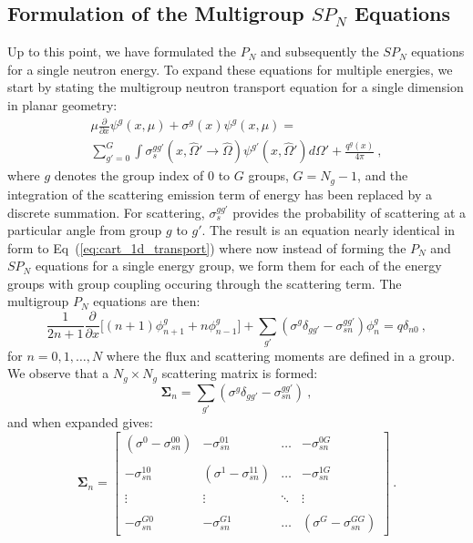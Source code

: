 \documentclass[letterpaper,12pt]{article}
\begin{document}
\subsection{Formulation of the Multigroup $SP_N$ Equations}
\label{subsec:mg_spn_equations}
Up to this point, we have formulated the $P_N$ and subsequently the
$SP_N$ equations for a single neutron energy. To expand these
equations for multiple energies, we start by stating the multigroup
neutron transport equation for a single dimension in planar geometry:
\begin{multline}
  \mu \frac{\partial}{\partial x} \psi^g(x,\mu) + \sigma^g(x)
  \psi^g(x,\mu) = \\ \sum_{g'=0}^{G} \int
  \sigma_s^{gg'}(x,\hat{\Omega}' \rightarrow \hat{\Omega})
  \psi^{g'}(x,\hat{\Omega}') d\Omega' + \frac{q^g(x)}{4 \pi}\:,
  \label{eq:cart_1d_multigroup}
\end{multline}
where $g$ denotes the group index of $0$ to $G$ groups, $G=N_g-1$, and
the integration of the scattering emission term of energy has been
replaced by a discrete summation. For scattering, $\sigma_s^{gg'}$
provides the probability of scattering at a particular angle from
group $g$ to $g'$. The result is an equation nearly identical in form
to Eq~(\ref{eq:cart_1d_transport}) where now instead of forming the
$P_N$ and $SP_N$ equations for a single energy group, we form them for
each of the energy groups with group coupling occuring through the
scattering term. The multigroup $P_N$ equations are then:
\begin{equation}
   \frac{1}{2n+1} \frac{\partial}{\partial x}\Big[ (n+1) \phi^g_{n+1}
     + n \phi^g_{n-1} \Big] +
   \sum_{g'}(\sigma^g\delta_{gg'}-\sigma^{gg'}_{sn}) \phi^g_n =
   q\delta_{n0} \:,
  \label{eq:multigroup_pn_equations}
\end{equation}
for $n = 0,1,\dotsc,N$ where the flux and scattering moments are
defined in a group. We observe that a $N_g \times N_g$ scattering
matrix is formed:
\begin{equation}
  \mathbf{\Sigma}_n =
  \sum_{g'}(\sigma^g\delta_{gg'}-\sigma^{gg'}_{sn})\:,
  \label{eq:scattering_matrix}
\end{equation}
and when expanded gives:
\begin{equation}
  \mathbf{\Sigma}_n =
  \begin{bmatrix}
    (\sigma^0-\sigma_{sn}^{00}) & -\sigma_{sn}^{01} & \dots &
    -\sigma_{sn}^{0G} \\ &&&\\ -\sigma_{sn}^{10} &
    (\sigma^1-\sigma_{sn}^{11}) & \dots & -\sigma_{sn}^{1G}
    \\ &&&\\ \vdots & \vdots & \ddots & \vdots
    \\ &&&\\ -\sigma_{sn}^{G0} & -\sigma_{sn}^{G1} & \dots &
    (\sigma^G-\sigma_{sn}^{GG})
  \end{bmatrix}\:.
\end{equation}
\end{document}
